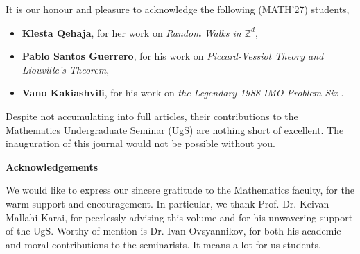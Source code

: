       \vspace{0.3cm}

  It is our honour and pleasure to 
  acknowledge the following {\color{cujgray}(MATH'27)} students,
  \begin{itemize}
    \item \textbf{Klesta Qehaja}, for her work on \emph{Random Walks in $\mathbb Z^d$},
    \item \textbf{Pablo Santos Guerrero}, for his work on \emph{Piccard-Vessiot Theory and Liouville's Theorem},
    \item \textbf{Vano Kakiashvili}, for his work on \emph{the Legendary 1988 IMO Problem Six} .
  \end{itemize}
  Despite not accumulating into full articles, their contributions 
  to the Mathematics Undergraduate Seminar (UgS) are nothing short of excellent. 
  The inauguration of this journal would not be possible without you. 

  \vspace{0.3cm}

  {\large\bfseries\color{cujblue}Acknowledgements}

  \vspace{0.3cm}

  We would like to express our sincere gratitude to the Mathematics faculty, for the warm support
  and encouragement. In particular, we thank Prof. Dr. Keivan Mallahi-Karai, for peerlessly advising
  this volume and for his unwavering support of the UgS\@. Worthy of mention is Dr. Ivan Ovsyannikov, for both his academic and moral 
  contributions to the seminarists. It means a lot for us students. 
  
\newpage